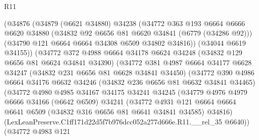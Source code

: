 \begin{lexlean}{R11}
\begin{coremodule}
                    (@34876
                      (@34879
                        (@6621 @34880)
                        @34238
                        (@34772
                          @363
                          @193
                          @6664
                          @6666
                          @6620
                          @34880
                          (@34832 @92 @6656 @81 @6620 @34841 (@6779 (@34286 @92)))
                          (@34790 @121 @6664 @6664 @34308 @6509 @34802 @34816))
                        (@34044 @6619 @34155))
                      (@34772
                        @372
                        @4988
                        @6664
                        @34178
                        @6624
                        @34248
                        (@34832 @129 @6656 @81 @6624 @34841 @34390)
                        (@34772
                          @381
                          @4987
                          @6664
                          @34177
                          @6628
                          @34247
                          (@34832 @231 @6656 @81 @6628 @34841 @34450)
                          (@34772
                            @390
                            @4986
                            @6664
                            @34176
                            @6632
                            @34246
                            (@34832 @236 @6656 @81 @6632 @34841 @34465)
                            (@34772
                              @4980
                              @4985
                              @34167
                              @34175
                              @34241
                              @34245
                              (@34779
                                @4976
                                @4979
                                @6666
                                @34166
                                (@6642 @6509)
                                @34241
                                (@34772
                                  @4931
                                  @121
                                  @6664
                                  @6664
                                  @6641
                                  @6509
                                  (@34832 @316 @6656 @81 @6641 @34841 @34585)
                                  @34816)
                                (LexLeanPreserve.C1ff171d22d5f7b976dcc052a277d666e.R11.__rel_35
                                  @6640))
                              (@34772
                                @4983
                                @121

\end{coremodule}
\end{lexlean}
